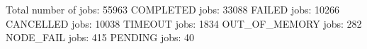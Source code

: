 Total number of jobs: 55963
COMPLETED jobs: 33088
FAILED jobs: 10266
CANCELLED jobs: 10038
TIMEOUT jobs: 1834
OUT_OF_MEMORY jobs: 282
NODE_FAIL jobs: 415
PENDING jobs: 40
